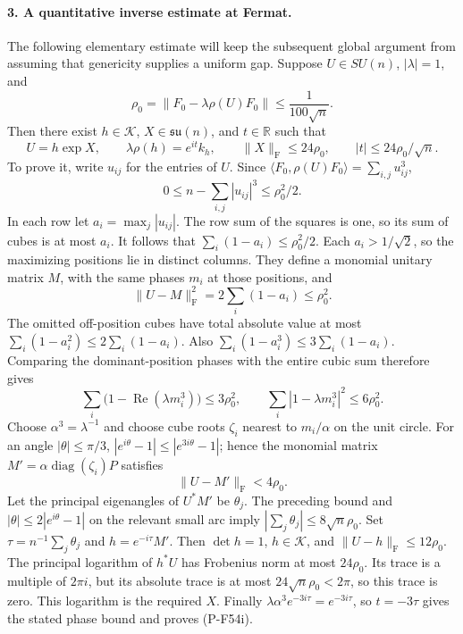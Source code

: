 \paragraph{3. A quantitative inverse estimate at Fermat.}
The following elementary estimate will keep the subsequent
global argument from assuming that genericity supplies a
uniform gap. Suppose $U\in SU(n)$, $|\lambda|=1$, and
\[
             \rho_0=\|F_0-\lambda\rho(U)F_0\|
                            \le\frac1{100\sqrt n}.
\]
Then there exist $h\in\mathcal K$, $X\in\mathfrak{su}(n)$,
and $t\in\mathbb R$ such that
\[
 U=h\exp X,\qquad \lambda\rho(h)=e^{it}k_h,
 \qquad \|X\|_{\mathrm F}\le24\rho_0,
 \qquad |t|\le24\rho_0/\sqrt n.                              \tag{P-F54i}
\]
To prove it, write $u_{ij}$ for the entries of $U$.
Since $\langle F_0,\rho(U)F_0\rangle=\sum_{i,j}u_{ij}^3$,
\[
 0\le n-\sum_{i,j}|u_{ij}|^3\le\rho_0^2/2.
\]
In each row let $a_i=\max_j|u_{ij}|$. The row sum of the
squares is one, so its sum of cubes is at most $a_i$.
It follows that $\sum_i(1-a_i)\le\rho_0^2/2$.
Each $a_i>1/\sqrt2$, so the maximizing positions lie in
distinct columns. They define a monomial unitary matrix
$M$, with the same phases $m_i$ at those positions, and
\[
                    \|U-M\|_{\mathrm F}^2
                       =2\sum_i(1-a_i)\le\rho_0^2.
\]
The omitted off-position cubes have total absolute value at
most $\sum_i(1-a_i^2)\le2\sum_i(1-a_i)$.
Also $\sum_i(1-a_i^3)\le3\sum_i(1-a_i)$.
Comparing the dominant-position phases with the entire cubic
sum therefore gives
\[
       \sum_i\bigl(1-\operatorname{Re}(\lambda m_i^3)\bigr)
                   \le3\rho_0^2,
       \qquad \sum_i|1-\lambda m_i^3|^2\le6\rho_0^2.
\]
Choose $\alpha^3=\lambda^{-1}$ and choose cube roots
$\zeta_i$ nearest to $m_i/\alpha$ on the unit circle.
For an angle $|\theta|\le\pi/3$,
$|e^{i\theta}-1|\le|e^{3i\theta}-1|$; hence the monomial
matrix $M'=\alpha\operatorname{diag}(\zeta_i)P$ satisfies
\[
                    \|U-M'\|_{\mathrm F}<4\rho_0.
\]
Let the principal eigenangles of $U^*M'$ be $\theta_j$.
The preceding bound and $|\theta|\le2|e^{i\theta}-1|$
on the relevant small arc imply
$|\sum_j\theta_j|\le8\sqrt n\rho_0$.
Set $\tau=n^{-1}\sum_j\theta_j$ and $h=e^{-i\tau}M'$.
Then $\det h=1$, $h\in\mathcal K$, and
$\|U-h\|_{\mathrm F}\le12\rho_0$.
The principal logarithm of $h^*U$ has Frobenius norm at
most $24\rho_0$. Its trace is a multiple of $2\pi i$,
but its absolute trace is at most
$24\sqrt n\rho_0<2\pi$, so this trace is zero.
This logarithm is the required $X$.
Finally $\lambda\alpha^3e^{-3i\tau}=e^{-3i\tau}$,
so $t=-3\tau$ gives the stated phase bound and proves
(P-F54i).

